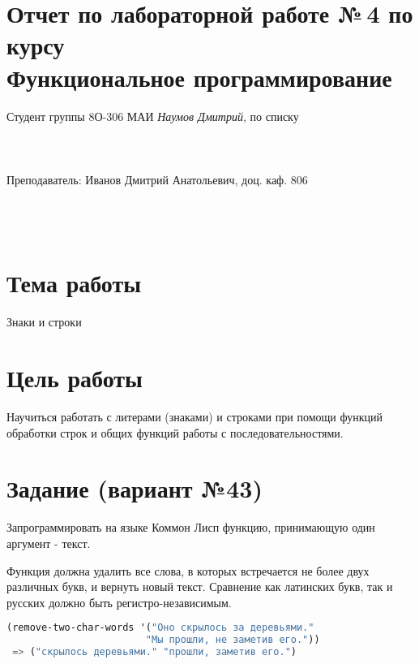 \documentclass[12pt]{article}
\begin{document}
\section*{Отчет по лабораторной работе №\,4 
по курсу \\
\guillemotleft Функциональное программирование\guillemotright}
\begin{flushright}
Студент группы 8О-306 МАИ \textit{Наумов Дмитрий},  по списку \\
 \\
 \\
\ \\
Преподаватель: Иванов Дмитрий Анатольевич, доц. каф. 806 \\
 \\
 \\
 \\

\end{flushright}

\section{Тема работы}
Знаки и строки

\section{Цель работы}
Научиться работать с литерами (знаками) и строками при помощи функций обработки строк и общих функций работы с последовательностями.

\section{Задание (вариант №43)}
Запрограммировать на языке Коммон Лисп функцию, принимающую один аргумент - текст.

Функция должна удалить все слова, в которых встречается не более двух различных букв, и вернуть новый текст. Сравнение как латинских букв, так и русских должно быть регистро-независимым.
\begin{lstlisting}[language=lisp]
(remove-two-char-words '("Оно скрылось за деревьями." 
                        "Мы прошли, не заметив его."))
 => ("скрылось деревьями." "прошли, заметив его.")
\end{lstlisting}
\end{document}
